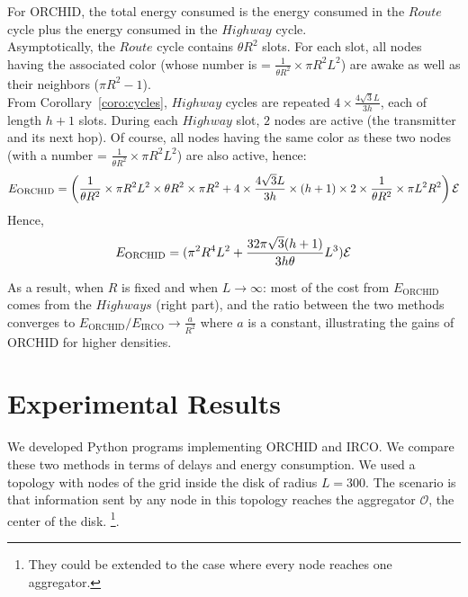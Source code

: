 For ORCHID, the total energy consumed is the energy consumed in the $Route$ cycle plus the energy consumed in the $Highway$ cycle.  \\
Asymptotically, the $Route$ cycle contains $\theta R^2$ slots. For each slot, all nodes having the associated color (whose number is = $\frac{1}{\theta R^2} \times \pi R^2L^2$) are awake as well as their neighbors ($\pi R^2 - 1$). \\ From Corollary~\ref{coro:cycles}, $Highway$ cycles are repeated $4 \times \frac{4 \sqrt{3} L}{3h}$, each of length $h+1$ slots. During each $Highway$ slot, $2$ nodes are active (the transmitter and its next hop). Of course, all nodes having the same color as these two nodes (with a number = $ \frac{1}{\theta R^2} \times \pi R^2 L^2$) are also active, hence:
\begin{equation}
E_\mathrm{ORCHID} = \left( \frac{1}{\theta R^2} \times \pi R^2 L^2 \times \theta R^2 \times \pi R^2 + 4 \times \frac{4 \sqrt{3} L}{3h} \times (h+1) \times 2  \times    \frac{1}{\theta R^2} \times \pi L^2 R^2 \right) \mathcal{E}
\end{equation}
Hence,
\begin{equation}
E_\mathrm{ORCHID} = (\pi^2R^4L^2 + \frac{32 \pi \sqrt{3} (h+1)}{3 h \theta}L^3)\mathcal{E}
\end{equation}

As a result, when $R$ is fixed and when $L \rightarrow \infty$: most of
the cost from $E_\mathrm{ORCHID}$ comes from the $Highways$ (right part),
and the ratio
between the  two methods converges to 
$E_\mathrm{ORCHID}/E_\mathrm{IRCO} \rightarrow \frac{a}{R^2}$ where $a$ is a constant, illustrating the gains of ORCHID for higher densities.














\section{Experimental Results}\label{sec:exp-res}


We developed Python programs implementing ORCHID and IRCO. 
We compare these two methods in terms of delays and energy consumption.
\newcommand{\OO}{$\mathcal{O}$}
We used a topology with nodes of the grid inside the disk of radius $L=300$. 
The scenario is that information sent by any node in this topology reaches the aggregator \OO, the center of the disk.
\footnote{They could be extended to the case where every node reaches one aggregator.}.

